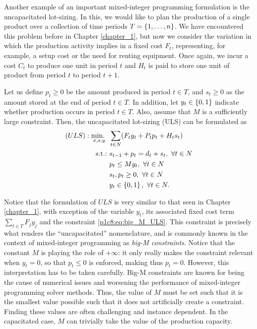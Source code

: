 Another example of an important mixed-integer programming formulation is the uncapacitated lot-sizing. In this, we would like to plan the production of a single product over a collection of time periods $T = \left\{ 1, \dots, n \right \}$. We have encountered this problem before in Chapter \ref{chapter_1}, but now we consider the variation in which the production activity implies in a fixed cost $F_t$, representing, for example, a setup cost or the need for renting equipment. Once again, we incur a cost $C_t$ to produce one unit in period $t$ and $H_t$ is paid to store one unit of product from period $t$ to period $t+1$.

Let us define $p_t \geq 0$ be the amount produced in period $t\in T$, and $s_t \geq 0$ as the amount stored at the end of period $t \in T$. In addition, let $y_t \in \left\{ 0,1 \right \}$ indicate whether production occurs in period $t\in T$. Also, assume that $M$ is a sufficiently large constraint. Then, the uncapacitated lot-sizing (ULS) can be formulated as
%
\begin{align}
	(ULS) : \mathop{\text{min.~}}_{x,s,y} \ & \sum_{t \in N} (F_ty_t + P_tp_t + H_ts_t) \nonumber \\
	\mathop{\text{s.t.:~}} & s_{t-1} + p_t = d_t + s_t, \ \forall t \in N \nonumber \\
	& p_t \leq My_t, \ \forall t \in N  \label{p1c8:eq:big_M_ULS}\\
	&s_t, p_t \geq 0, \ \forall t \in N \nonumber \\
	&y_t \in \left\{ 0,1 \right \}, \ \forall t \in N. \nonumber
\end{align} 

Notice that the formulation of $ULS$ is very similar to that seen in Chapter \ref{chapter_1}, with exception of the variable $y_t$, its associated fixed cost term $\sum_{t \in T} F_jy_j$ and the constraint \eqref{p1c8:eq:big_M_ULS}. This constraint is precisely what renders the ``uncapacitated'' nomenclature, and is commonly known in the context of mixed-integer programming as \emph{big-M constraints}. Notice that the constant $M$ is playing the role of $+\infty$: it only really makes the constraint relevant when $y_t = 0$, so that $p_t \le 0$ is enforced, making thus $p_t = 0$. However, this interpretation has to be taken carefully. Big-M constraints are known for being the cause of numerical issues and worsening the performance of mixed-integer programming solver methods. Thus, the value of $M$ must be set such that it is the smallest value possible such that it does not artificially create a constraint. Finding these values are often challenging and instance dependent. In the capacitated case, $M$ can trivially take the value of the production capacity. 
 
